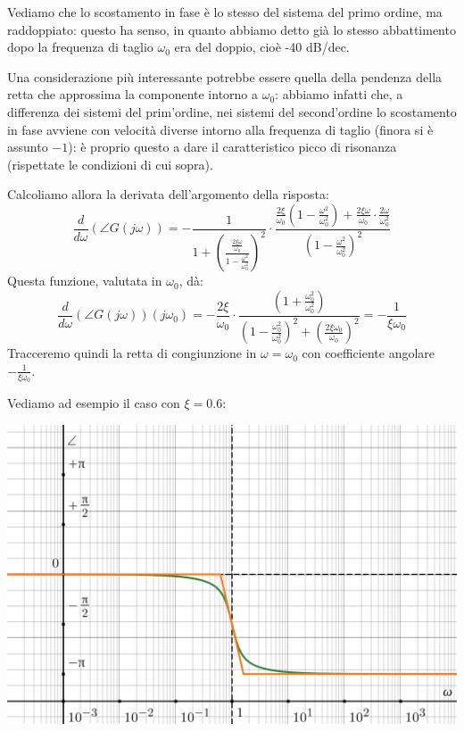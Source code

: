 \documentclass[a4paper,11pt]{article}
\begin{document}
\par\bigskip

Vediamo che lo scostamento in fase è lo stesso del sistema del primo ordine, ma raddoppiato: questo ha senso, in quanto abbiamo detto già lo stesso abbattimento dopo la frequenza di taglio $\omega_0$ era del doppio, cioè -40 dB/dec.

\par\smallskip

Una considerazione più interessante potrebbe essere quella della pendenza della retta che approssima la componente intorno a $\omega_0$: abbiamo infatti che, a differenza dei sistemi del prim'ordine, nei sistemi del second'ordine lo scostamento in fase avviene con velocità diverse intorno alla frequenza di taglio (finora si è assunto $-1$): è proprio questo a dare il caratteristico picco di risonanza (rispettate le condizioni di cui sopra).

Calcoliamo allora la derivata dell'argomento della risposta:
$$
\frac{d}{d\omega} \left( \angle G(j\omega) \right) 
= - \frac{1}{1 + \left( \frac{ \frac{2 \xi \omega}{\omega_0} }{ 1 - \frac{\omega^2}{\omega_0^2} } \right)^2 } 
\cdot \frac{ \frac{2 \xi}{\omega_0} \left( 1 - \frac{\omega^2}{\omega_0^2} \right) + \frac{2 \xi \omega}{\omega_0} \cdot \frac{2 \omega}{\omega_0^2} }{ \left( 1 - \frac{\omega^2}{\omega_0^2} \right)^2 }
$$
Questa funzione, valutata in $\omega_0$, dà:
$$
\frac{d}{d\omega} \left( \angle G(j\omega) \right) (j \omega_0) = - \frac{2 \xi}{\omega_0} \cdot \frac{ \left( 1 + \frac{\omega_0^2}{\omega_0^2} \right) }{ \left( 1 - \frac{\omega_0^2}{\omega_0^2} \right)^2 + \left( \frac{2 \xi \omega_0}{\omega_0} \right)^2 } = - \frac{1}{\xi \omega_0}
$$
Tracceremo quindi la retta di congiunzione in $\omega = \omega_0$ con coefficiente angolare $- \frac{1}{\xi \omega_0}$.

\par\bigskip

\noindent
\begin{minipage}{\textwidth}
Vediamo ad esempio il caso con $\xi = 0.6$:

\begin{center}
	\includegraphics[scale=0.3]{../figures/order2_bode/phase_weird.png}
\end{center}
\end{minipage}
\end{document}
